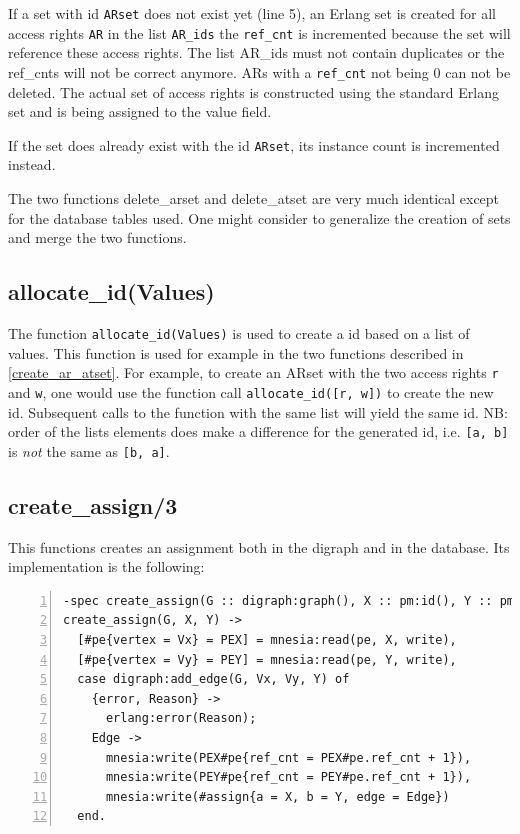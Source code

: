 \documentclass[12pt,a4paper,titlepage]{book}
\begin{document}
		If a set with id \lstinline|ARset| does not exist yet (line 5), an Erlang set is created for all access rights \lstinline|AR| in the list \lstinline|AR_ids| the \lstinline|ref_cnt| is incremented because the set will reference these access rights. The list AR\_ids must not contain duplicates or the ref\_cnts will not be correct anymore. ARs with a \lstinline|ref_cnt| not being 0 can not be deleted. The actual set of access rights is constructed using the standard Erlang set and is being assigned to the value field. 
		
		If the set does already exist with the id \lstinline|ARset|, its instance count is incremented instead.
		
		The two functions delete\_arset and delete\_atset are very much identical except for the database tables used. One might consider to generalize the creation of sets and merge the two functions.
		
	\subsection{allocate\_id(Values)}
	
		The function \lstinline|allocate_id(Values)| is used to create a id based on a list of values. This function is used for example in the two functions described in \ref{create_ar_atset}. For example, to create an ARset with the two access rights \lstinline|r| and \lstinline|w|, one would use the function call \lstinline|allocate_id([r, w])| to create the new id.  Subsequent calls to the function with the same list will yield the same id. NB: order of the lists elements does make a difference for the generated id, i.e. \lstinline|[a, b]| is \emph{not} the same as \lstinline|[b, a]|.
		
	\subsection{create\_assign/3}
	
		This functions creates an assignment both in the digraph and in the database. Its implementation is the following:
		
		\begin{lstlisting}[caption={create\_assign/3}, basicstyle=\footnotesize, breaklines=false, numbers=left]
-spec create_assign(G :: digraph:graph(), X :: pm:id(), Y :: pm:id()) -> ok | no_return().
create_assign(G, X, Y) ->
  [#pe{vertex = Vx} = PEX] = mnesia:read(pe, X, write),
  [#pe{vertex = Vy} = PEY] = mnesia:read(pe, Y, write),
  case digraph:add_edge(G, Vx, Vy, Y) of
    {error, Reason} ->
      erlang:error(Reason);
    Edge ->
      mnesia:write(PEX#pe{ref_cnt = PEX#pe.ref_cnt + 1}),
      mnesia:write(PEY#pe{ref_cnt = PEY#pe.ref_cnt + 1}),
      mnesia:write(#assign{a = X, b = Y, edge = Edge})
  end.\end{lstlisting}
  
\end{document}
